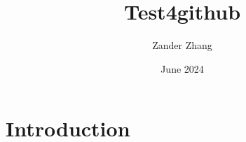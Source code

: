\documentclass{article}
\title{Test4github}
\author{Zander Zhang}
\date{June 2024}
\begin{document}
\maketitle

\section{Introduction}
\end{document}
